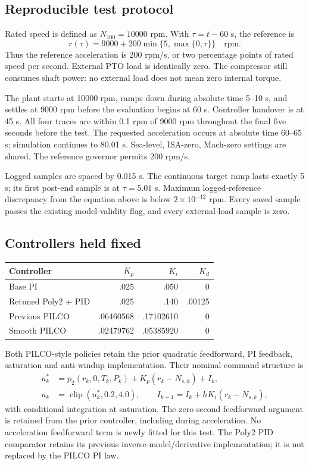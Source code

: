 \subsection{Reproducible test protocol}
Rated speed is defined as $N_{100}=10000$ rpm. With $\tau=t-60$ s, the reference is
\begin{equation}r(\tau)=9000+200\min\{5,\max\{0,\tau\}\}\quad\text{rpm}.\end{equation}
Thus the reference acceleration is $200$ rpm/s, or two percentage points of rated speed per second. External PTO load is identically zero. The compressor still consumes shaft power: no external load does not mean zero internal torque.

The plant starts at 10000 rpm, ramps down during absolute time 5--10 s, and settles at 9000 rpm before the evaluation begins at 60 s. Controller handover is at 45 s. All four traces are within 0.1 rpm of 9000 rpm throughout the final five seconds before the test. The requested acceleration occurs at absolute time 60--65 s; simulation continues to 80.01 s. Sea-level, ISA-zero, Mach-zero settings are shared. The reference governor permits 200 rpm/s.

Logged samples are spaced by 0.015 s. The continuous target ramp lasts exactly 5 s; its first post-end sample is at $\tau=5.01$ s. Maximum logged-reference discrepancy from the equation above is below $2\times10^{-12}$ rpm. Every saved sample passes the existing model-validity flag, and every external-load sample is zero.

\subsection{Controllers held fixed}
\begin{center}\small\begin{tabular}{lrrr}\toprule Controller & $K_p$ & $K_i$ & $K_d$\\\midrule
Base PI & .025 & .050 & 0\\
Retuned Poly2 + PID & .025 & .140 & .00125\\
Previous PILCO & .06460568 & .17102610 & 0\\
Smooth PILCO & .02479762 & .05385920 & 0\\\bottomrule\end{tabular}\end{center}
Both PILCO-style policies retain the prior quadratic feedforward, PI feedback, saturation and anti-windup implementation. Their nominal command structure is
\begin{align}u_k^*&=p_2(r_k,0,T_k,P_k)+K_p(r_k-N_{s,k})+I_k,\\
u_k&=\operatorname{clip}(u_k^*,0.2,4.0),\qquad
I_{k+1}=I_k+hK_i(r_k-N_{s,k}),\end{align}
with conditional integration at saturation. The zero second feedforward argument is retained from the prior controller, including during acceleration. No acceleration feedforward term is newly fitted for this test. The Poly2 PID comparator retains its previous inverse-model/derivative implementation; it is not replaced by the PILCO PI law.
